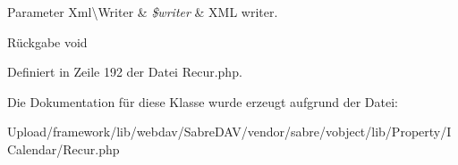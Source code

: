 \begin{DoxyParams}[1]{Parameter}
Xml\textbackslash{}\+Writer & {\em \$writer} & X\+ML writer.\\
\hline
\end{DoxyParams}
\begin{DoxyReturn}{Rückgabe}
void 
\end{DoxyReturn}


Definiert in Zeile 192 der Datei Recur.\+php.



Die Dokumentation für diese Klasse wurde erzeugt aufgrund der Datei\+:\begin{DoxyCompactItemize}
\item 
Upload/framework/lib/webdav/\+Sabre\+D\+A\+V/vendor/sabre/vobject/lib/\+Property/\+I\+Calendar/Recur.\+php\end{DoxyCompactItemize}
